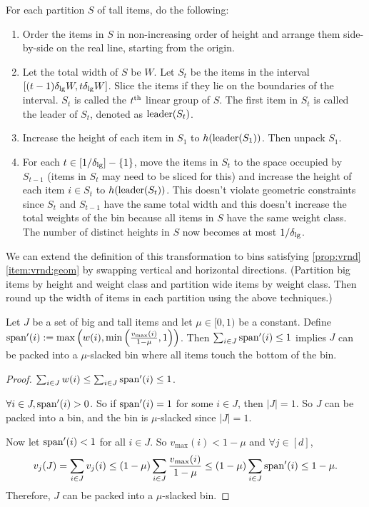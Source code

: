 \begin{transformation}
For each partition $S$ of tall items, do the following:
\begin{enumerate}
\item Order the items in $S$ in non-increasing order of height and arrange them side-by-side
    on the real line, starting from the origin.
\item Let the total width of $S$ be $W$.
    Let $S_t$ be the items in the interval $[(t-1)\delta_{\mathrm{lg}} W, t \delta_{\mathrm{lg}} W]$.
    Slice the items if they lie on the boundaries of the interval.
    $S_t$ is called the $t^{\textrm{th}}$ linear group of $S$.
    The first item in $S_t$ is called the leader of $S_t$, denoted as $\operatorname{leader}(S_t)$.
\item Increase the height of each item in $S_1$ to $h(\operatorname{leader}(S_1))$. Then unpack $S_1$.
\item For each $t \in [1/\delta_{\mathrm{lg}}] - \{1\}$,
    move the items in $S_t$ to the space occupied by $S_{t-1}$
    (items in $S_t$ may need to be sliced for this)
    and increase the height of each item $i \in S_t$ to $h(\operatorname{leader}(S_t))$.
    This doesn't violate geometric constraints since $S_t$ and $S_{t-1}$
    have the same total width and this doesn't increase the total weights of the bin
    because all items in $S$ have the same weight class.
    The number of distinct heights in $S$ now becomes at most $1/\delta_{\mathrm{lg}}$.
\end{enumerate}

We can extend the definition of this transformation to bins satisfying
\cref{prop:vrnd}\ref{item:vrnd:geom} by swapping vertical and horizontal directions.
(Partition big items by height and weight class and partition wide items by weight class.
Then round up the width of items in each partition using the above techniques.)
\end{transformation}

\begin{lemma}
\label{lem:bot-slack-pack}
Let $J$ be a set of big and tall items and let $\mu \in [0, 1)$ be a constant.
Define $\operatorname{span}'(i) := \max\left(w(i), \min\left(\frac{v_{\max}(i)}{1-\mu}, 1\right)\right)$.
Then $\sum_{i \in J} \operatorname{span}'(i) \le 1$ implies $J$ can be packed into
a $\mu$-slacked bin where all items touch the bottom of the bin.
\end{lemma}
\begin{proof}
$\sum_{i \in J} w(i) \le \sum_{i \in J} \operatorname{span}'(i) \le 1$.

$\forall i \in J, \operatorname{span}'(i) > 0$.
So if $\operatorname{span}'(i) = 1$ for some $i \in J$, then $|J| = 1$.
So $J$ can be packed into a bin, and the bin is $\mu$-slacked since $|J| = 1$.

Now let $\operatorname{span}'(i) < 1$ for all $i \in J$. So $v_{\max}(i) < 1-\mu$ and $\forall j \in [d]$,
\[ v_j(J) = \sum_{i \in J} v_j(i) \le (1-\mu) \sum_{i \in J} \frac{v_{\max}(i)}{1-\mu}
\le (1-\mu) \sum_{i \in J} \operatorname{span}'(i) \le 1-\mu. \]
Therefore, $J$ can be packed into a $\mu$-slacked bin.
\end{proof}

